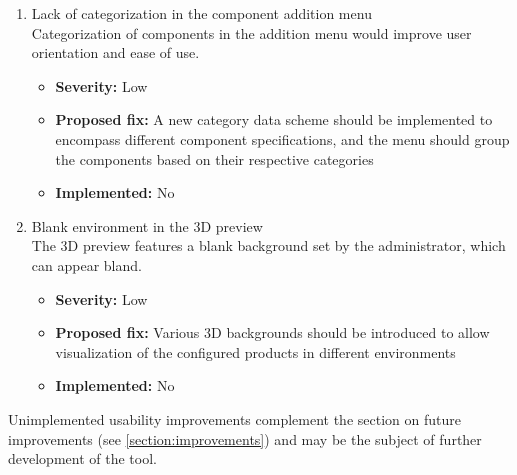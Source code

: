 \begin{enumerate}[label=\textbf{I\arabic*:}, leftmargin=*]
    \item Lack of categorization in the component addition menu
        \vspace{2pt}
        \\Categorization of components in the addition menu would improve user orientation and ease of use.
        \begin{itemize}[noitemsep, label=\trianglebullet]
            \item \textbf{Severity:} Low
            \item \textbf{Proposed fix:} A new category data scheme should be implemented to encompass different component specifications, and the menu should group the components based on their respective categories
            \item \textbf{Implemented:} No
        \end{itemize}
        \vspace{4pt}

    \item Blank environment in the 3D preview
        \vspace{2pt}
        \\The 3D preview features a blank background set by the administrator, which can appear bland.
        \begin{itemize}[noitemsep, label=\trianglebullet]
            \item \textbf{Severity:} Low
            \item \textbf{Proposed fix:} Various 3D backgrounds should be introduced to allow visualization of the configured products in different environments
            \item \textbf{Implemented:} No
        \end{itemize}
        \vspace{4pt}
\end{enumerate}

Unimplemented usability improvements complement the section on future improvements (see \autoref{section:improvements}) and may be the subject of further development of the tool.  